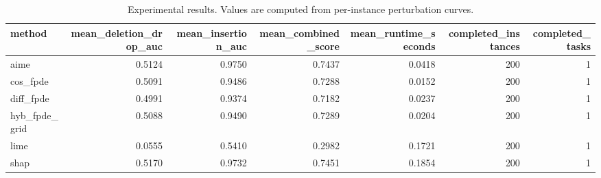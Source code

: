 \begin{table}[t]
\caption{Experimental results. Values are computed from per-instance perturbation curves.}
\label{tab:main_results_computed}
\centering
\begin{tabular}{lrrrrrr}
\toprule
method & mean\_deletion\_drop\_auc & mean\_insertion\_auc & mean\_combined\_score & mean\_runtime\_seconds & completed\_instances & completed\_tasks \\
\midrule
aime & 0.5124 & 0.9750 & 0.7437 & 0.0418 & 200 & 1 \\
cos\_fpde & 0.5091 & 0.9486 & 0.7288 & 0.0152 & 200 & 1 \\
diff\_fpde & 0.4991 & 0.9374 & 0.7182 & 0.0237 & 200 & 1 \\
hyb\_fpde\_grid & 0.5088 & 0.9490 & 0.7289 & 0.0204 & 200 & 1 \\
lime & 0.0555 & 0.5410 & 0.2982 & 0.1721 & 200 & 1 \\
shap & 0.5170 & 0.9732 & 0.7451 & 0.1854 & 200 & 1 \\
\bottomrule
\end{tabular}

\end{table}
